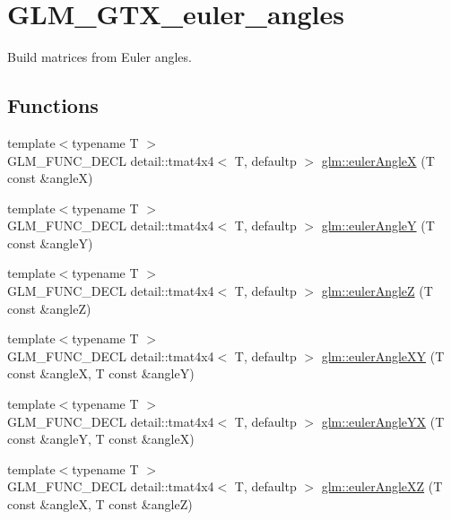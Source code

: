 \hypertarget{group__gtx__euler__angles}{}\section{G\+L\+M\+\_\+\+G\+T\+X\+\_\+euler\+\_\+angles}
\label{group__gtx__euler__angles}


Build matrices from Euler angles.  


\subsection*{Functions}
\begin{DoxyCompactItemize}
\item 
{\footnotesize template$<$typename T $>$ }\\G\+L\+M\+\_\+\+F\+U\+N\+C\+\_\+\+D\+E\+CL detail\+::tmat4x4$<$ T, defaultp $>$ \hyperlink{group__gtx__euler__angles_ga97994e53d856ae89ed2622d66ab86c2c}{glm\+::euler\+AngleX} (T const \&angleX)
\item 
{\footnotesize template$<$typename T $>$ }\\G\+L\+M\+\_\+\+F\+U\+N\+C\+\_\+\+D\+E\+CL detail\+::tmat4x4$<$ T, defaultp $>$ \hyperlink{group__gtx__euler__angles_gacdc188a23a928d57d4490ff7d646fb96}{glm\+::euler\+AngleY} (T const \&angleY)
\item 
{\footnotesize template$<$typename T $>$ }\\G\+L\+M\+\_\+\+F\+U\+N\+C\+\_\+\+D\+E\+CL detail\+::tmat4x4$<$ T, defaultp $>$ \hyperlink{group__gtx__euler__angles_gaf55b28c29ebd7ba728f1ad6490c89687}{glm\+::euler\+AngleZ} (T const \&angleZ)
\item 
{\footnotesize template$<$typename T $>$ }\\G\+L\+M\+\_\+\+F\+U\+N\+C\+\_\+\+D\+E\+CL detail\+::tmat4x4$<$ T, defaultp $>$ \hyperlink{group__gtx__euler__angles_ga83a52d36fd752c92ce189197b51ea785}{glm\+::euler\+Angle\+XY} (T const \&angleX, T const \&angleY)
\item 
{\footnotesize template$<$typename T $>$ }\\G\+L\+M\+\_\+\+F\+U\+N\+C\+\_\+\+D\+E\+CL detail\+::tmat4x4$<$ T, defaultp $>$ \hyperlink{group__gtx__euler__angles_ga7599a8aaf3bf33b15517dd522a6d8020}{glm\+::euler\+Angle\+YX} (T const \&angleY, T const \&angleX)
\item 
{\footnotesize template$<$typename T $>$ }\\G\+L\+M\+\_\+\+F\+U\+N\+C\+\_\+\+D\+E\+CL detail\+::tmat4x4$<$ T, defaultp $>$ \hyperlink{group__gtx__euler__angles_ga61110cb520fbf21dd541cf4e25d81a65}{glm\+::euler\+Angle\+XZ} (T const \&angleX, T const \&angleZ)

\end{DoxyCompactItemize}
